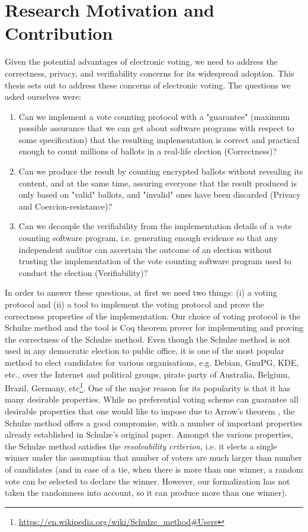 \section{Research Motivation and Contribution}
Given the potential advantages of electronic voting,  we need to address
the correctness, privacy, and verifiability concerns for its widespread adoption. 
This thesis sets out to address these concerns of electronic voting. 
The questions we asked ourselves were:
 \begin{enumerate} 
  \item Can we implement a vote counting protocol with a "guarantee"
  (maximum possible assurance that we can get about software programs
   with respect to some specification) 
   that the resulting implementation is correct and  practical enough
    to count  millions of ballots in a real-life election (Correctness)?

  \item Can we produce the result by counting encrypted ballots without revealing 
  its content, and at the same time, 
  assuring everyone that the result produced is only based on "valid" ballots, 
  and "invalid" ones have been discarded  (Privacy and Coercion-resistance)?
 \item Can we decouple the verifiability from the implementation details of a vote counting software program, i.e. 
    generating enough evidence so that any independent auditor can 
    ascertain the outcome of an election without trusting the implementation 
    of the vote counting software program used to conduct the election (Verifiability)?
  \end{enumerate}


In order to answer these questions, at first we need two things: (i) a voting protocol and 
(ii) a tool to implement the voting protocol and prove the correctness properties of the implementation. 
Our choice of voting protocol is the   Schulze method \citep{Schulze:2011:NMC} and 
the tool is Coq \citep{Bertot:2004:ITP} theorem prover  for implementing and proving 
the correctness of  the Schulze method.
Even though the Schulze method is not used in any democratic election to public office,
it is one of the most popular method to elect candidates for various organisations, e.g. Debian, GnuPG, 
KDE,  etc., over the Internet and political groups, pirate party of Australia, Belgium, Brazil, 
Germany, etc\footnote{\url{https://en.wikipedia.org/wiki/Schulze_method#Users}}.
One of the major reason for its popularity is that it has many desirable properties.
While no preferential voting scheme can guarantee all desirable properties that one would
like to impose due to Arrow’s theorem \citep{Arrow:1950:DCS}, the Schulze method offers a good compromise, 
with a number of important properties already  established  in  Schulze’s  original  paper. 
Amongst the various  properties, the Schulze method satisfies the \textit{resolvability criterion}, 
i.e. it elects a single winner under the assumption that number of voters are much larger than
 number of candidates (and in case of a tie, when there is more than one winner, a random vote can be 
selected to declare the winner.  However, our formalization 
has not taken the randomness into account, so it can produce more than one winner). 


